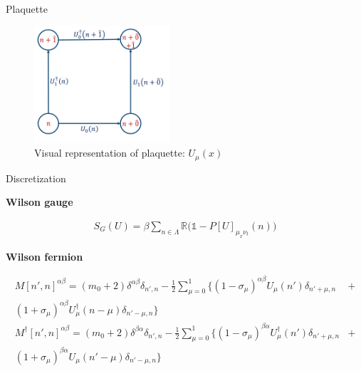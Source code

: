 \documentclass[10pt]{beamer}
\begin{document}
 \begin{frame}{Plaquette}
    \begin{figure}
        \centering
        \includegraphics[width=0.45\textwidth]{plaquette.png}
        \caption{Visual representation of plaquette: $U_{\mu}(x)$~\cite{lecturenote}}
    \end{figure}
 
 \end{frame}



 \begin{frame}{Discretization}
     \begin{center} \textbf{Wilson gauge}\end{center}
     \begin{align}
        S_G(U) = \beta\sum\limits_{n\in\Lambda}\mathbb{R}\big(\mathbb{1} - P[U]_{\mu_x\nu_t}(n)\big)
    \end{align}
     \begin{center} \textbf{Wilson fermion}\end{center}
     \begin{align}
        M[n',n]^{\alpha\beta} = (m_0+2)\delta^{\alpha\beta}\delta_{n',n} -\frac{1}{2}\sum\limits_{\mu=0}^{1}\{(1-\sigma_\mu)^{\alpha\beta}U_{\mu}(n')\delta_{n'+\mu,n} &+ \nonumber\\
        (1+\sigma_\mu)^{\alpha\beta}U^{\dagger}_{\mu}(n-\mu)\delta_{n'-\mu,n}  \}\\
        M^{\dagger}[n',n]^{\alpha\beta} = (m_0+2)\delta^{\beta\alpha}\delta_{n',n} -\frac{1}{2}\sum\limits_{\mu=0}^{1}\{(1-\sigma_\mu)^{\beta\alpha}U^{\dagger}_{\mu}(n')\delta_{n'+\mu,n} &+  \nonumber \\
        (1+\sigma_\mu)^{\beta\alpha}U_{\mu}(n'-\mu)\delta_{n'-\mu,n}  \}
    \end{align}

 \end{frame}
\end{document}
